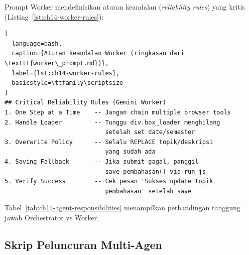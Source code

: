 Prompt Worker mendefinisikan aturan keandalan (\textit{reliability rules}) yang kritis (Listing~\ref{lst:ch14-worker-rules}):

\begin{lstlisting}[
  language=bash,
  caption={Aturan keandalan Worker (ringkasan dari \texttt{worker\_prompt.md})},
  label={lst:ch14-worker-rules},
  basicstyle=\ttfamily\scriptsize
]
## Critical Reliability Rules (Gemini Worker)
1. One Step at a Time    -- Jangan chain multiple browser tools
2. Handle Loader         -- Tunggu div.box_loader menghilang
                            setelah set date/semester
3. Overwrite Policy      -- Selalu REPLACE topik/deskripsi
                            yang sudah ada
4. Saving Fallback       -- Jika submit gagal, panggil
                            save_pembahasan() via run_js
5. Verify Success        -- Cek pesan 'Sukses update topik
                            pembahasan' setelah save
\end{lstlisting}


Tabel~\ref{tab:ch14-agent-responsibilities} menampilkan perbandingan tanggung jawab Orchestrator vs Worker.
\begin{table}[h]
\centering
\caption{Perbandingan tanggung jawab Orchestrator vs Worker}
\label{tab:ch14-agent-responsibilities}
\footnotesize
{}
\normalsize
\end{table}

\subsection{Skrip Peluncuran Multi-Agen}

